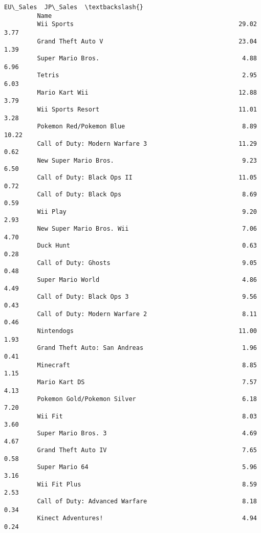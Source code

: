 \documentclass[11pt]{article}
\begin{document}
\begin{Verbatim}[commandchars=\\\{\}]
                                                             EU\_Sales  JP\_Sales  \textbackslash{}
         Name                                                                     
         Wii Sports                                             29.02      3.77   
         Grand Theft Auto V                                     23.04      1.39   
         Super Mario Bros.                                       4.88      6.96   
         Tetris                                                  2.95      6.03   
         Mario Kart Wii                                         12.88      3.79   
         Wii Sports Resort                                      11.01      3.28   
         Pokemon Red/Pokemon Blue                                8.89     10.22   
         Call of Duty: Modern Warfare 3                         11.29      0.62   
         New Super Mario Bros.                                   9.23      6.50   
         Call of Duty: Black Ops II                             11.05      0.72   
         Call of Duty: Black Ops                                 8.69      0.59   
         Wii Play                                                9.20      2.93   
         New Super Mario Bros. Wii                               7.06      4.70   
         Duck Hunt                                               0.63      0.28   
         Call of Duty: Ghosts                                    9.05      0.48   
         Super Mario World                                       4.86      4.49   
         Call of Duty: Black Ops 3                               9.56      0.43   
         Call of Duty: Modern Warfare 2                          8.11      0.46   
         Nintendogs                                             11.00      1.93   
         Grand Theft Auto: San Andreas                           1.96      0.41   
         Minecraft                                               8.85      1.15   
         Mario Kart DS                                           7.57      4.13   
         Pokemon Gold/Pokemon Silver                             6.18      7.20   
         Wii Fit                                                 8.03      3.60   
         Super Mario Bros. 3                                     4.69      4.67   
         Grand Theft Auto IV                                     7.65      0.58   
         Super Mario 64                                          5.96      3.16   
         Wii Fit Plus                                            8.59      2.53   
         Call of Duty: Advanced Warfare                          8.18      0.34   
         Kinect Adventures!                                      4.94      0.24   

\end{Verbatim}
\end{document}

